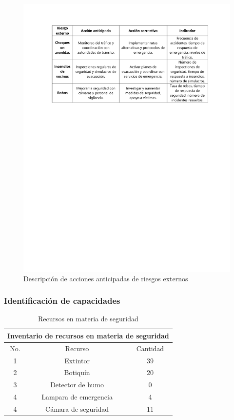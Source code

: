     \begin{figure}[H]
        \centering
        \includegraphics[trim = {1mm 129mm 1mm 1mm},clip,scale=0.45]{34/img/riesgoExterno.pdf}
        \caption{Descripción de acciones anticipadas de riesgos externos}
        \label{fig:enter-label12}
    \end{figure}
    
    
    \subsubsection{Identificación de capacidades}
    \begin{table}[H]
        \centering
        \caption{Recursos en materia de seguridad}
        \begin{tabular}{c c c}
        \hline
        \multicolumn{3}{c}{Inventario de recursos en materia de seguridad}\\
        \hline
             No.& Recurso & Cantidad  \\
        \hline
             1& Extintor & 39\\ 
        \hline
             2& Botiquín & 20\\
        \hline
             3& Detector de humo & 0 \\
        \hline
             4& Lampara de emergencia &4  \\  
        \hline
             4& Cámara de seguridad&11 \\
        \hline     
        \end{tabular}
        \label{tab:inventario}
    \end{table}
    
